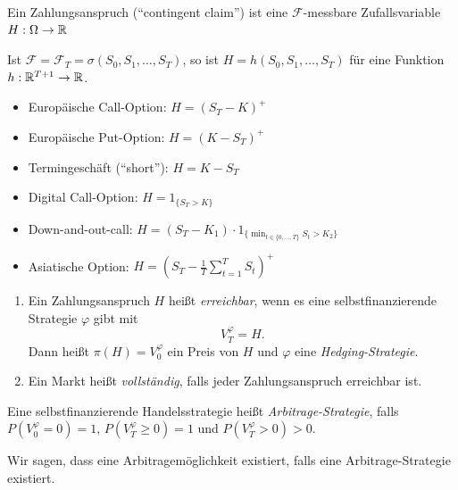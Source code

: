 \documentclass[a4paper,twoside,DIV15,BCOR12mm]{scrbook}
\newcommand{\cF}{\mathcal F}
\begin{document}
\begin{definition}
Ein Zahlungsanspruch (“contingent claim”) ist eine $\cF$-messbare Zufallsvariable $H:\Omega\to \mathbb{R}$
\end{definition}

\begin{bemerkung}
Ist $\cF = \cF_T = \sigma(S_0,S_1,\ldots,S_T)$, so ist $H = h(S_0,S_1,\ldots,S_T)$ für eine Funktion $h:\mathbb{R}^{T+1} \to \mathbb{R}$.
\end{bemerkung}

\begin{beispiel}
\begin{itemize}
\item Europäische Call-Option: $H=(S_T-K)^+$
\item Europäische Put-Option: $H=(K-S_T)^+$
\item Termingeschäft (“short”): $H=K-S_T$
\item Digital Call-Option: $H = 1_{\{S_T > K\}}$
\item Down-and-out-call: $H = (S_T-K_1) \cdot 1_{\{\min_{t\in\{0,\ldots,T\}} S_t > K_2\}}$
\item Asiatische Option: $H = (S_T - \frac1T \sum_{t=1}^T S_t)^+$
\end{itemize}
\end{beispiel}

\begin{definition}
\begin{enumerate}
\item Ein Zahlungsanspruch $H$ heißt \emph{erreichbar}, wenn es eine selbstfinanzierende Strategie $\varphi$ gibt mit
\[
V_T^\varphi = H.
\]
Dann heißt $\pi(H) = V_0^\varphi$ ein Preis von $H$ und $\varphi$ eine \emph{Hedging-Strategie}.
\item Ein Markt heißt \emph{vollständig},  falls jeder Zahlungsanspruch erreichbar ist.
\end{enumerate}
\end{definition}

\begin{definition}
Eine selbstfinanzierende Handelsstrategie heißt \emph{Arbitrage-Strategie},  falls $P(V_0^\varphi = 0)=1$, $P(V_T^\varphi \ge 0) = 1$ und $P(V_T^\varphi>0) >0$.

Wir sagen, dass eine Arbitragemöglichkeit existiert, falls eine Arbitrage-Strategie existiert.
\end{definition}
\end{document}
